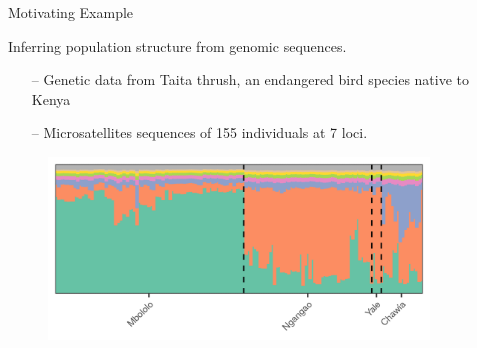 
\begin{frame}{Motivating Example}

Inferring population structure from genomic sequences.
\begin{itemize}
  \item[--] Genetic data from Taita thrush, an endangered bird species native to Kenya
  \citep{galbusera:2000:thrush}
  \item[--] Microsatellites sequences of 155 individuals at 7 loci.
\end{itemize}


\begin{figure}[!h]
\centering
\includegraphics[width = 0.9\textwidth]{./figure/structure_init-1.png}
\end{figure}

\end{frame}

